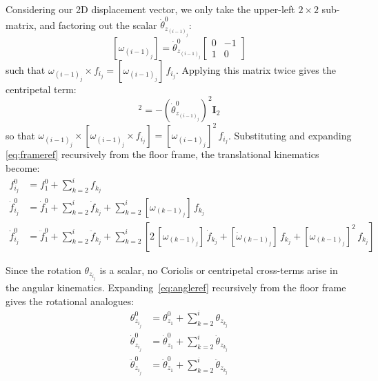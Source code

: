 Considering our 2D displacement vector, we only take the upper-left $2\times2$ sub-matrix, and factoring out the scalar $\dot{\theta}^{0}_{z_{(i-1)_j}}$:
\begin{equation} \label{eq:skew}
    [\omega_{(i-1)_j}] = \dot{\theta}^{0}_{z_{(i-1)_j}}
    \begin{bmatrix} 0 & -1 \\ 1 & 0 \end{bmatrix}
\end{equation}
such that $\omega_{(i-1)_j} \times f_{i_j} = [\omega_{(i-1)_j}]\,f_{i_j}$. Applying this matrix twice gives the centripetal term:
\begin{equation}
    [\omega_{(i-1)_j}]^2 = -\left(\dot{\theta}^{0}_{z_{(i-1)_j}}\right)^2 \mathbf{I}_2
\end{equation}
so that $\omega_{(i-1)_j} \times [\omega_{(i-1)_j} \times f_{i_j}] = [\omega_{(i-1)_j}]^2\,f_{i_j}$. Substituting and expanding
\eqref{eq:frameref} recursively from the floor frame, the translational kinematics become:
\begin{align}
    f^{0}_{i_j}
        &= f^{0}_{1} + \sum^{i}_{k=2} f_{k_j}
        \label{eq:pos_expanded} \\
    \dot{f}^{0}_{i_j}
        &= \dot{f}^{0}_{1} + \sum^{i}_{k=2} \dot{f}_{k_j}
         + \sum^{i}_{k=2} [\omega_{(k-1)_j}]\, f_{k_j}
        \label{eq:vel_expanded} \\
    \ddot{f}^{0}_{i_j}
        &= \ddot{f}^{0}_{1} + \sum^{i}_{k=2} \ddot{f}_{k_j}
         + \sum^{i}_{k=2} \left[
             2\,[\omega_{(k-1)_j}]\,\dot{f}_{k_j}
             + [\dot{\omega}_{(k-1)_j}]\,f_{k_j}
             + [\omega_{(k-1)_j}]^2\,f_{k_j}
         \right]
        \label{eq:acc_expanded}
\end{align}

Since the rotation $\theta_{z_{i_j}}$ is a scalar, no Coriolis or centripetal cross-terms arise in the angular kinematics. Expanding~\eqref{eq:angleref} recursively from the floor frame gives the rotational analogues:
\begin{align}
    \theta^{0}_{z_{i_j}}
        &= \theta^{0}_{z_1} + \sum^{i}_{k=2} \theta_{z_{k_j}}
        \label{eq:angle_expanded} \\
    \dot{\theta}^{0}_{z_{i_j}}
        &= \dot{\theta}^{0}_{z_1} + \sum^{i}_{k=2} \dot{\theta}_{z_{k_j}}
        \label{eq:angvel_expanded} \\
    \ddot{\theta}^{0}_{z_{i_j}}
        &= \ddot{\theta}^{0}_{z_1} + \sum^{i}_{k=2} \ddot{\theta}_{z_{k_j}}
        \label{eq:angacc_expanded}
\end{align}

